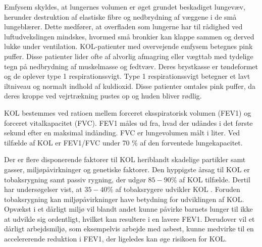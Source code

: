 Emfysem skyldes, at lungernes volumen er øget grundet beskadiget lungevæv, herunder destruktion af elastiske fibre og nedbrydning af væggene i de små lungeblærer. Dette medfører, at overfladen som lungerne har til rådighed ved luftudvekslingen mindskes, hvormed små bronkier kan klappe sammen og derved lukke under ventilation.\cite{Frausing2011a,Flaschen-Hansen2008} KOL-patienter med overvejende emfysem betegnes pink puffer. Disse patienter lider ofte af alvorlig afmagring eller vægttab med tydelige tegn på nedbrydning af muskelmasse og fedtvæv. Deres brystkasse er tøndeformet og de oplever type 1 respirationssvigt. Type 1 respirationssvigt betegner et lavt iltniveau og normalt indhold af kuldioxid. Disse patienter omtales pink puffer, da deres kroppe ved vejrtrækning pustes op og huden bliver rødlig.\cite{Healthguidances2016}

KOL bestemmes ved ratioen mellem forceret eksspiratorisk volumen (FEV1) og forceret vitalkapacitet (FVC). FEV1 måles ud fra, hvad der udåndes i det første sekund efter en maksimal indånding. FVC er lungevolumen målt i liter. Ved tilfælde af KOL er FEV1/FVC under 70 \% af den forventede lungekapacitet.\cite{Basisbogen2016}

Der er flere disponerende faktorer til KOL heriblandt skadelige partikler samt gasser, miljøpåvirkninger og genetiske faktorer. Den hyppigste årsag til KOL er tobaksrygning samt passiv rygning, der udgør $85-90\%$ af KOL tilfælde.\cite{dsam2016,Basisbogen2016,Martinez2016,Sygdomsbyrden2015} Dertil har undersøgelser vist, at $35-40\%$ af tobaksrygere udvikler KOL \cite{Folkesundhed2007}.
Foruden tobaksrygning kan miljøpåvirkninger have betydning for udviklingen af KOL. Opvækst i et dårligt miljø vil blandt andet kunne påvirke barnets lunger til ikke at udvikle sig ordentligt, hvilket kan resultere i en lavere FEV1. Derudover vil et dårligt arbejdsmiljø, som eksempelvis arbejde med asbest, kunne medvirke til en accelererende reduktion i FEV1, der ligeledes kan øge risikoen for KOL.\cite{Martinez2016} 
